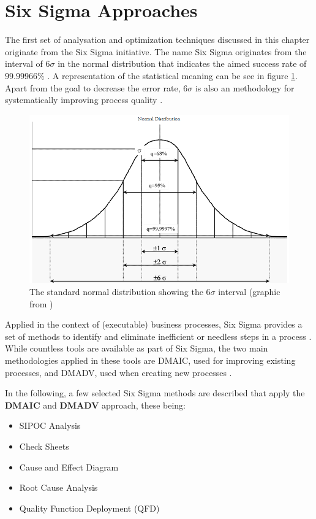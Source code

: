


\section{Six Sigma Approaches}
The first set of analysation and optimization techniques discussed in this chapter originate from the Six Sigma initiative. The name Six Sigma originates from the interval of $6\sigma$ in the normal distribution that indicates the aimed success rate of $99.99966\%$ \cite{siha2008business}\cite{vivekananthamoorthy2011lean} . A representation of the statistical meaning can be see in figure \ref{fig:six-sigma}. Apart from the goal to decrease the error rate, $6\sigma$ is also an methodology for systematically improving process quality \cite{tennant2017six}.

\begin{figure}[H]
		\centering
		\includegraphics[width=0.7\columnwidth]{graphics/six-sigma}
		\caption{The standard normal distribution showing the $6\sigma$ interval (graphic from \cite{vivekananthamoorthy2011lean})} 
		\label{fig:six-sigma} 
\end{figure}

Applied in the context of (executable) business processes, Six Sigma provides a set of methods to identify and eliminate inefficient or needless steps in a process \cite{vom2014handbook}. While countless tools are available as part of Six Sigma, the two main methodologies applied in these tools are \gls{DMAIC}, used for improving existing processes, and \gls{DMADV}, used when creating new processes \cite{selvi2014six} .


In the following, a few selected Six Sigma methods are described that apply the \textbf{DMAIC} and  \textbf{DMADV} approach, these being:  
\begin{itemize}
	\item SIPOC Analysis
	\item Check Sheets
	\item Cause and Effect Diagram
	\item Root Cause Analysis
	\item Quality Function Deployment (QFD)
\end{itemize}

